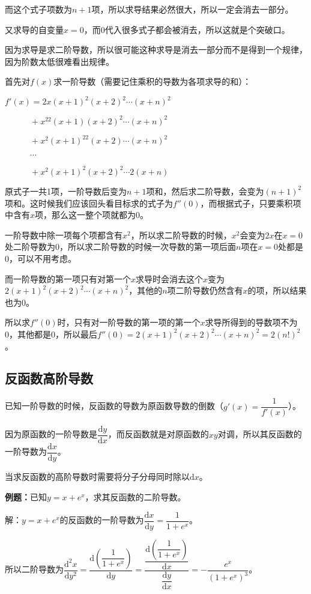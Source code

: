 \documentclass[UTF8, 12pt]{ctexart}
\begin{document}
而这个式子项数为$n+1$项，所以求导结果必然很大，所以一定会消去一部分。

又求导的自变量$x=0$，而0代入很多式子都会被消去，所以这就是个突破口。

因为求导是求二阶导数，所以很可能这种求导是消去一部分而不是得到一个规律，因为阶数太低很难看出规律。

首先对$f(x)$求一阶导数（需要记住乘积的导数为各项求导的和）：

$f'(x)=2x(x+1)^2(x+2)^2\cdots(x+n)^2$

$\quad\quad\quad+x^22(x+1)(x+2)^2\cdots(x+n)^2$

$\quad\quad\quad+x^2(x+1)^22(x+2)\cdots(x+n)^2$

$\quad\quad\quad\cdots$

$\quad\quad\quad+x^2(x+1)^2(x+2)^2\cdots 2(x+n)$

原式子一共1项，一阶导数后变为$n+1$项和，然后求二阶导数，会变为$(n+1)^2$项和。这时候我们应该回头看目标求的式子为$f''(0)$，而根据式子，只要乘积项中含有$x$项，那么这一整个项就都为0。

一阶导数中除一项每个项都含有$x^2$，所以求二阶导数的时候，$x^2$会变为$2x$在$x=0$处二阶导数为0，所以求二阶导数的时候一次导数的第一项后面$n$项在$x=0$处都是0，可以不用考虑。

而一阶导数的第一项只有对第一个$x$求导时会消去这个$x$变为$2(x+1)^2(x+2)^2\cdots(x+n)^2$，其他的$n$项二阶导数仍然含有$x$的项，所以结果也为0。

所以求$f''(0)$时，只有对一阶导数的第一项的第一个$x$求导所得到的导数项不为0，其他都是0，所以最后$f''(0)=2(x+1)^2(x+2)^2\cdots(x+n)^2=2(n!)^2$。

\subsection{反函数高阶导数}

已知一阶导数的时候，反函数的导数为原函数导数的倒数（$g'(x)=\dfrac{1}{f'(x)}$）。

因为原函数的一阶导数是$\dfrac{\textrm{d}y}{\textrm{d}x}$，而反函数就是对原函数的$xy$对调，所以其反函数的一阶导数为$\dfrac{\textrm{d}x}{\textrm{d}y}$。

当求反函数的高阶导数时需要将分子分母同时除以$\textrm{d}x$。

\textbf{例题：}已知$y=x+e^x$，求其反函数的二阶导数。

解：$y=x+e^x$的反函数的一阶导数为$\dfrac{\textrm{d}x}{\textrm{d}y}=\dfrac{1}{1+e^x}$。\medskip

所以二阶导数为$\dfrac{\textrm{d}^2x}{\textrm{d}y^2}=\dfrac{\textrm{d}\left(\dfrac{1}{1+e^{x}}\right)}{\textrm{d}y}=\dfrac{\dfrac{\textrm{d}\left(\dfrac{1}{1+e^{x}}\right)}{\textrm{d}x}}{\dfrac{\textrm{d}y}{\textrm{d}x}}=-\dfrac{e^x}{(1+e^x)^3}$。
\end{document}

